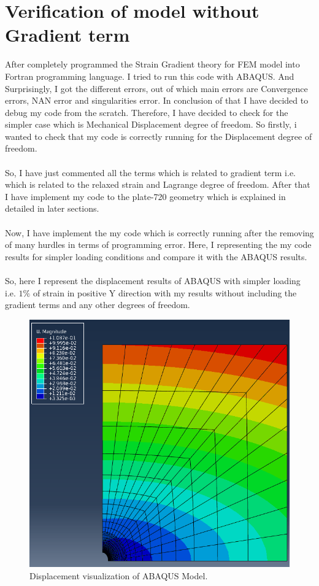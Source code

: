 \documentclass[12pt]{article}
\begin{document}
\section{Verification of model without Gradient term}
After completely programmed the Strain Gradient theory for FEM model into Fortran programming language. I tried to run this code with ABAQUS. And Surprisingly, I got the different errors, out of which main errors are Convergence errors, NAN error and singularities error. In conclusion of that I have decided to debug my code from the scratch. Therefore, I have decided to check for the simpler case which is Mechanical Displacement degree of freedom. So firstly, i wanted to check that my code is correctly running for the Displacement degree of freedom.
\\
\\
So, I have just commented all the terms which is related to gradient term i.e. which is related to the relaxed strain and Lagrange degree of freedom. After that I have implement my code to the plate-720 geometry which is explained in detailed in later sections.
\\
\\ 
Now, I have implement the my code which is correctly running after the removing of many hurdles in terms of programming error. Here, I representing the my code results for simpler loading conditions and compare it with the ABAQUS results.  
\\
\\
So, here I represent the displacement results of ABAQUS with simpler loading i.e. $ 1 \% $ of strain in positive Y direction with my results without including the gradient terms and any other degrees of freedom.
\begin{figure}[H]
	\begin{center}
		\includegraphics[scale=0.4]{ABAQUS_result.png}  
	\end{center}  
    \caption{Displacement visualization of ABAQUS Model.}
\end{figure}
\end{document}
